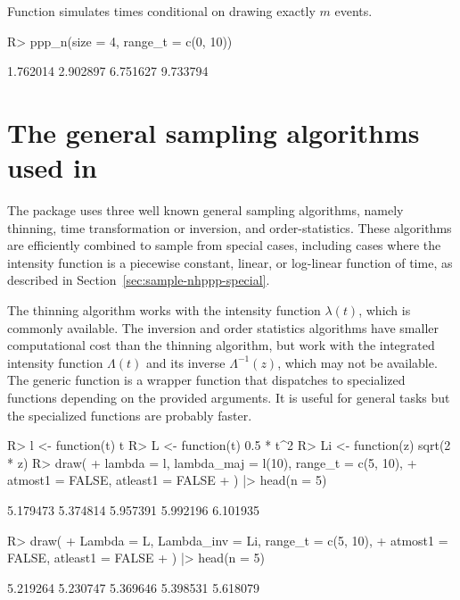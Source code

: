 \documentclass[article,nojss]{jss}\usepackage[]{graphicx}\usepackage[]{xcolor}
\newcommand{\fct}[1]{\code{#1()}}
\begin{document}
Function \fct{ppp\_n} simulates times conditional on drawing exactly $m$ events.
\begin{Schunk}
\begin{Sinput}
R> ppp_n(size = 4, range_t = c(0, 10))
\end{Sinput}
\begin{Soutput}
[1] 1.762014 2.902897 6.751627 9.733794
\end{Soutput}
\end{Schunk}

\section[The general sampling algorithms used in nhppp]{The general sampling algorithms used in }\label{sec:general-sampling}

The  package uses three well known general sampling algorithms, namely thinning, time transformation or inversion, and order-statistics. These algorithms are efficiently combined to sample from special cases, including cases where the intensity function is a piecewise constant, linear, or log-linear function of time, as described in Section~\ref{sec:sample-nhppp-special}.

The thinning algorithm works with the intensity function $\lambda(t)$, which is commonly available. The inversion and order statistics algorithms have smaller computational cost than the thinning algorithm, but work with the integrated intensity function $\Lambda(t)$ and its inverse $\Lambda^{-1}(z)$, which may not be available. The generic function \fct{draw} is a wrapper function that dispatches to specialized functions depending on the provided arguments. It is useful for general tasks but the specialized functions are probably faster.

\begin{Schunk}
\begin{Sinput}
R> l <- function(t) t
R> L <- function(t) 0.5 * t^2
R> Li <- function(z) sqrt(2 * z)
R> draw(
+    lambda = l, lambda_maj = l(10), range_t = c(5, 10),
+    atmost1 = FALSE, atleast1 = FALSE
+  ) |> head(n = 5)
\end{Sinput}
\begin{Soutput}
[1] 5.179473 5.374814 5.957391 5.992196 6.101935
\end{Soutput}
\begin{Sinput}
R> draw(
+    Lambda = L, Lambda_inv = Li, range_t = c(5, 10),
+    atmost1 = FALSE, atleast1 = FALSE
+  ) |> head(n = 5)
\end{Sinput}
\begin{Soutput}
[1] 5.219264 5.230747 5.369646 5.398531 5.618079
\end{Soutput}
\end{Schunk}
\end{document}
